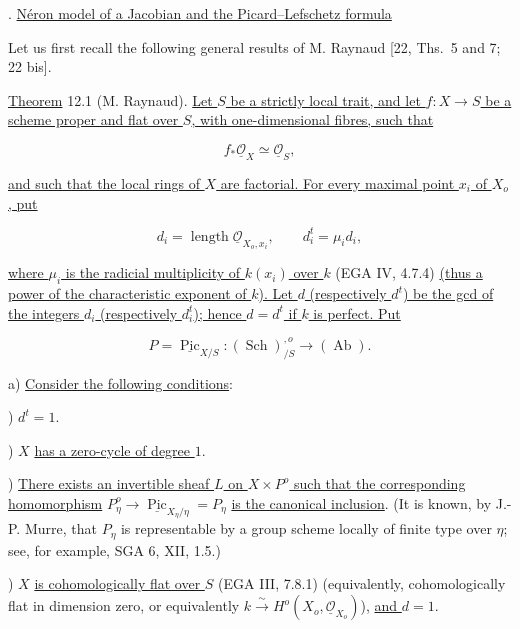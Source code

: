 \medskip
{}. \underline{N\'eron model of a Jacobian and the Picard--Lefschetz
formula}

Let us first recall the following general results of M. Raynaud
[22, Ths.~5 and 7; 22 bis].

\medskip
\noindent
\underline{Theorem} 12.1 (M. Raynaud). \underline{Let $S$ be a strictly
local trait, and let $f:X\to S$ be a scheme proper and flat over $S$, with
one-dimensional fibres, such that}

\begin{equation}\tag{12.1.1}
 f_*\underline{\mathcal O}_X\simeq\underline{\mathcal O}_S,
\end{equation}

\noindent
\underline{and such that the local rings of $X$ are factorial. For every
maximal point $x_i$ of $X_o$, put}

\begin{equation}\tag{12.1.2}
 d_i=\operatorname{length}\underline{\mathcal O}_{X_o,x_i},
 \qquad d_i^t=\mu_i d_i,
\end{equation}

\noindent
\underline{where $\mu_i$ is the radicial multiplicity of $k(x_i)$ over
$k$} (EGA IV, 4.7.4) \underline{(thus a power of the characteristic
exponent of $k$). Let $d$ (respectively $d^t$) be the gcd of the integers
$d_i$ (respectively $d_i^t$); hence $d=d^t$ if $k$ is perfect. Put}

\begin{equation}\tag{12.1.3}
 P=\underline{\operatorname{Pic}}_{X/S}:
   (\operatorname{Sch})_{/S}^{,o}\longrightarrow(\operatorname{Ab}).
\end{equation}

\noindent
a) \underline{Consider the following conditions}:

\smallskip
{}) $d^t=1$.

\smallskip
{}) $X$ \underline{has a zero-cycle of degree $1$}.

\smallskip
{}) \underline{There exists an invertible sheaf $L$ on $X\times P^o$ such
that the corresponding homomorphism}
$P^o_\eta\to\underline{\operatorname{Pic}}_{X_\eta/\eta}=P_\eta$
\underline{is the canonical inclusion}. (It is known, by J.-P. Murre,
that $P_\eta$ is representable by a group scheme locally of finite type
over $\eta$; see, for example, SGA 6, XII, 1.5.)

\smallskip
{}) $X$ \underline{is cohomologically flat over $S$} (EGA III, 7.8.1)
(equivalently, cohomologically flat in dimension zero, or equivalently
$k\xrightarrow{\sim}H^o(X_o,\underline{\mathcal O}_{X_o})$),
\underline{and $d=1$}.

